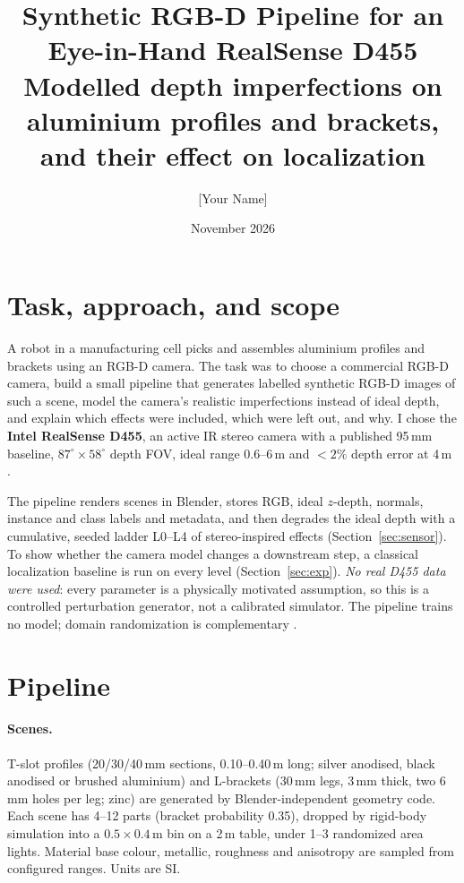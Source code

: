 \documentclass[10pt]{article}
\title{\vspace{-1.6em}\textbf{Synthetic RGB-D Pipeline for an Eye-in-Hand RealSense D455}\\
\large Modelled depth imperfections on aluminium profiles and brackets, and their effect on localization}
\author{[Your Name]}
\date{November 2026}
\begin{document}
\maketitle
\vspace{-1.2em}

\section{Task, approach, and scope}
A robot in a manufacturing cell picks and assembles aluminium profiles and brackets using an RGB-D camera. The task was to choose a commercial RGB-D camera, build a small pipeline that generates labelled synthetic RGB-D images of such a scene, model the camera's realistic imperfections instead of ideal depth, and explain which effects were included, which were left out, and why. I chose the \textbf{Intel RealSense D455}, an active IR stereo camera with a published 95\,mm baseline, $87^\circ\times58^\circ$ depth FOV, ideal range 0.6--6\,m and $<2\%$ depth error at 4\,m \cite{d455}.

The pipeline renders scenes in Blender, stores RGB, ideal $z$-depth, normals, instance and class labels and metadata, and then degrades the ideal depth with a cumulative, seeded ladder L0--L4 of stereo-inspired effects (Section~\ref{sec:sensor}). To show whether the camera model changes a downstream step, a classical localization baseline is run on every level (Section~\ref{sec:exp}). \emph{No real D455 data were used}: every parameter is a physically motivated assumption, so this is a controlled perturbation generator, not a calibrated simulator. The pipeline trains no model; domain randomization is complementary \cite{tobin2017,tremblay2018}.

\section{Pipeline}
\paragraph{Scenes.}
T-slot profiles (20/30/40\,mm sections, 0.10--0.40\,m long; silver anodised, black anodised or brushed aluminium) and L-brackets (30\,mm legs, 3\,mm thick, two 6\,mm holes per leg; zinc) are generated by Blender-independent geometry code. Each scene has 4--12 parts (bracket probability 0.35), dropped by rigid-body simulation into a $0.5\times0.4$\,m bin on a 2\,m table, under 1--3 randomized area lights. Material base colour, metallic, roughness and anisotropy are sampled from configured ranges. Units are SI.
\end{document}
